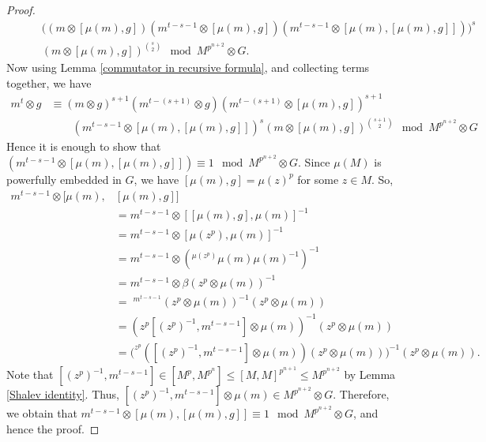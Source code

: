 \documentclass[12pt]{elsarticle}
\newtheorem*{main corollary*}{Main Corollary}
\theoremstyle{definition}
\begin{document}
\begin{proof}
\begin{align*}
       &\qquad \big((m\otimes [\mu(m),g])(m^{t-s-1}\otimes[\mu(m),g])(m^{t-s-1}\otimes [\mu(m),[\mu(m),g]])\big)^s\\
       & \qquad (m\otimes [\mu(m),g])^{\binom{s}{2}} \mod M^{p^{n+2}}\otimes G.
    \end{align*}Now using Lemma \ref{commutator in recursive formula}, and collecting terms together, we have 
   \begin{align*}    
   m^t \otimes g&\equiv(m\otimes g)^{s+1}(m^{t-(s+1)}\otimes g)(m^{t-(s+1)}\otimes [\mu(m),g])^{s+1}\\
   &\qquad (m^{t-s-1}\otimes [\mu(m),[\mu(m),g]])^s(m\otimes[\mu(m),g])^{\binom{s+1}{2}}\mod M^{p^{n+2}}\otimes G
   \end{align*}Hence it is enough to show that ${(m^{t-s-1}\otimes [\mu(m),[\mu(m),g]])\equiv 1\mod  M^{p^{n+2}}\otimes G}$. Since $\mu(M)$ is powerfully embedded in $G$, we have $[\mu(m),g]=\mu(z)^p$ for some $z\in M$. So,
 \begin{align*}
         m^{t-s-1}\otimes [\mu(m),&[\mu(m),g]]\\
         &= m^{t-s-1}\otimes [[\mu(m),g],\mu(m)]^{-1}\\
      &=m^{t-s-1}\otimes [\mu(z^p),\mu(m)]^{-1}\\
      &=m^{t-s-1}\otimes(^{\mu(z^p)}\mu(m)\mu(m)^{-1})^{-1}\\
      &=m^{t-s-1}\otimes\beta(z^p\otimes\mu(m))^{-1}\\
      &=\;^{m^{t-s-1}}(z^p\otimes\mu(m))^{-1}(z^p\otimes\mu(m))\\
      &=(z^p[(z^p)^{-1},{m^{t-s-1}}]\otimes\mu(m))^{-1}(z^p\otimes\mu(m))\\
      &=\big(^{z^p}([(z^p)^{-1},{m^{t-s-1}}]\otimes\mu(m))(z^p\otimes\mu(m))\big)^{-1}(z^p\otimes\mu(m)).
   \end{align*}
 Note that ${[(z^p)^{-1},m^{t-s-1}]\in [M^p,M^{p^n}]\leq[M,M]^{p^{n+1}}\leq M^{p^{n+2}}}$ by  Lemma \ref{Shalev identity}. Thus, $[(z^p)^{-1},{m^{t-s-1}}]\otimes\mu(m)\in M^{p^{n+2}}\otimes G$. Therefore, we obtain that ${m^{t-s-1}\otimes [\mu(m),[\mu(m),g]]\equiv 1\mod M^{p^{n+2}}\otimes G}$, and hence the proof.
    \end{proof} 
  
\end{document}
